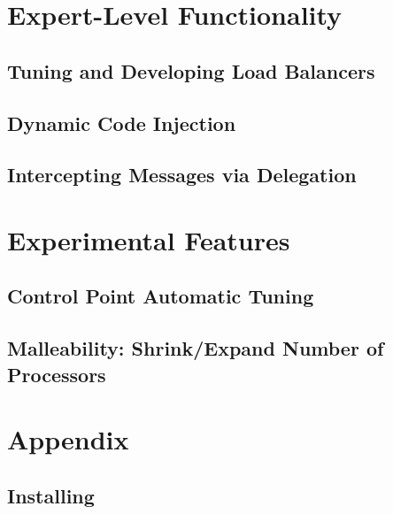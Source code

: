 \documentclass[10pt]{report}
\begin{document}


\part{Expert-Level Functionality}

\chapter{Tuning and Developing Load Balancers}
\label{advancedlb}
  

\chapter{Dynamic Code Injection}
\label{python}
  

\chapter{Intercepting Messages via Delegation}
\label{delegation}
  

%


\part{Experimental Features}

\chapter{Control Point Automatic Tuning}
\label{sec:controlpoint}
  

\chapter{Malleability: Shrink/Expand Number of Processors}
\label{sec:shrinkexpand}
  

\part{Appendix}
\appendix

%

\chapter{Installing \charm}
\label{sec:install}
  
\end{document}
